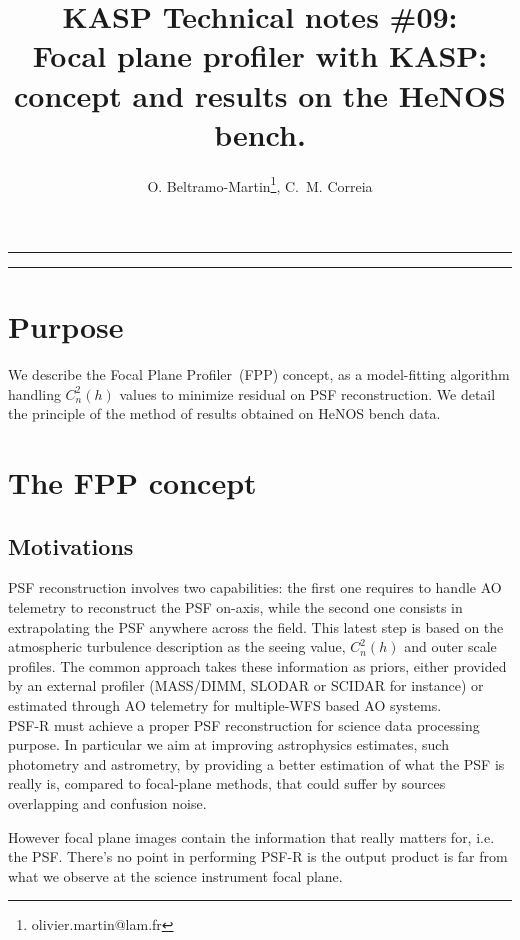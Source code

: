 \documentclass[12pt]{article}
\title{KASP Technical notes \#09:\\ Focal plane profiler with KASP: concept and results on the HeNOS bench.}
\author{O. Beltramo-Martin\footnote{olivier.martin@lam.fr}, C.~M. Correia}
\date{}
\newcommand{\cnh}{C_n^2(h)}
\begin{document}
\maketitle
\rule{\columnwidth}{0.1mm}
\tableofcontents
\rule{\columnwidth}{0.1mm}
\section{Purpose}

We describe the Focal Plane Profiler~(FPP) concept, as a model-fitting algorithm handling $\cnh$ values to minimize residual on PSF reconstruction. We detail the principle of the method of results obtained on HeNOS bench data.

\section{The FPP concept}
\subsection{Motivations}

PSF reconstruction involves two capabilities: the first one requires to handle AO telemetry to reconstruct the PSF on-axis, while the second one consists in extrapolating the PSF anywhere across the field. This latest step is based on the atmospheric turbulence description as the seeing value, $\cnh$ and outer scale profiles. The common approach takes these information as priors, either provided by an external profiler (MASS/DIMM, SLODAR or SCIDAR for instance) or estimated through AO telemetry for multiple-WFS based AO systems.\\

PSF-R must achieve a proper PSF reconstruction for science data processing purpose. In particular we aim at improving astrophysics estimates, such photometry and astrometry, by providing a better estimation of what the PSF is really is, compared to focal-plane methods, that could suffer by sources overlapping and confusion noise. 

However focal plane images contain the information that really matters for, i.e. the PSF. There's no point in performing PSF-R is the output product is far from what we observe at the science instrument focal plane.\\
\end{document}
